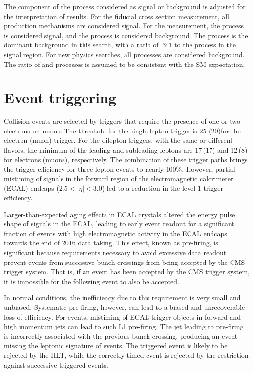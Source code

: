 The component of the \WZjj process considered as signal or background
is adjusted for the interpretation of results. For the \WZjj fiducial
cross section measurement, all \WZjj production mechanisms are considered 
signal.
For the \EWWZ measurement,
the \EWWZ process is considered signal, and the \QCDWZ process is considered
background. The \QCDWZ process is the dominant background in this search,
with a ratio of $~3:1$ to the \EWWZ process in the signal region.
For new physics searches, all \WZjj processes are considered background.
The ratio of \EWWZ and \QCDWZ processes is assumed to be consistent with the SM
expectation.

\section{Event triggering}

Collision events are selected by triggers that require the presence of
one or two electrons or muons.
The \pt threshold for the single lepton trigger is 25 (20)\GeV for the electron (muon) trigger.
For the dilepton triggers, with the same or different flavors, the minimum \pt of the leading and subleading leptons are 17\,(17) and 12\,(8)\GeV
for electrons (muons), respectively.
The combination of these trigger paths brings the trigger efficiency for three-lepton events
to nearly 100\%.
However, partial mistiming of signals in the forward region of the electromagnetic calorimeter (ECAL) endcaps
($2.5 < \left|\eta\right| < 3.0$) led to a reduction in the level 1 trigger efficiency. 

Larger-than-expected aging effects in ECAL crystals altered the 
energy pulse shape of signals in the ECAL, leading to
early event readout for a significant fraction of events
with high electromagnetic activity in the ECAL endcaps towards the end
of 2016 data taking.
This effect, known as pre-firing, is significant because requirements necessary
to avoid excessive data readout prevent events from successive bunch crossings
from being accepted by the CMS trigger system. 
That is, if an event has been accepted by the CMS trigger
system, it is impossible for the following event to also be accepted.

In normal conditions, the inefficiency due to this requirement is very small
and unbiased. Systematic pre-firing, however, can lead to a biased and unrecoverable
loss of efficiency.
For \EWWZ events, mistiming of ECAL trigger objects in
forward and high momentum jets can lead to such L1 pre-firing.
The jet leading to pre-firing is incorrectly associated with the previous bunch
crossing, producing an event missing the leptonic signature of \WZ events.
The triggered event is likely to be rejected by the HLT, while the correctly-timed
event is rejected by the restriction against successive triggered events.

